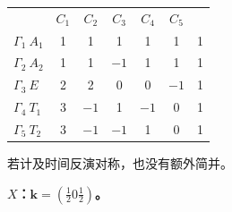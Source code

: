 \begin{center}
\begin{tabular}{lcccccc}
 & $C_{1}$ & $C_{2}$ & $C_{3}$ & $C_{4}$ & $C_{5}$ & \\
$\Gamma_{1}\ A_{1}$ & 1 & 1 & 1 & 1 & 1 & 1\\
$\Gamma_{2}\ A_{2}$ & 1 & 1 & $-1$ & 1 & 1 & 1\\
$\Gamma_{3}\ E$ & 2 & 2 & 0 & 0 & $-1$ & 1\\
$\Gamma_{4}\ T_{1}$ & 3 & $-1$ & 1 & $-1$ & 0 & 1\\
$\Gamma_{5}\ T_{2}$ & 3 & $-1$ & $-1$ & 1 & 0 & 1
\end{tabular}
\end{center}
若计及时间反演对称，也没有额外简并。

\noindent\textbf{$X$：$\mathbf{k} = (\frac{1}{2}0\frac{1}{2})$。}

